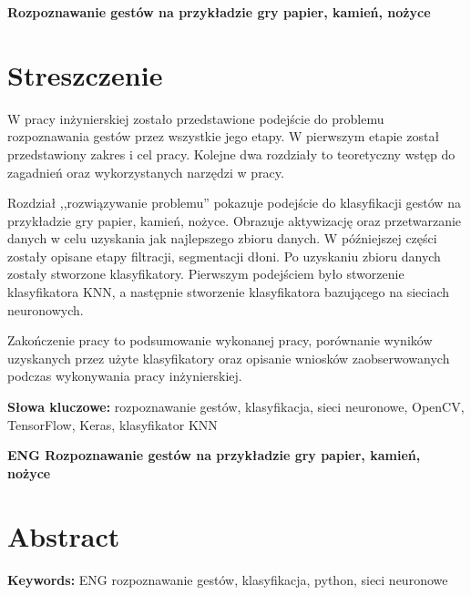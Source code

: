 \newpage
\begin{center}
\large \bf
Rozpoznawanie gestów na przykładzie gry papier, kamień, nożyce
\end{center}

\section*{Streszczenie}
W pracy inżynierskiej zostało przedstawione podejście do problemu rozpoznawania gestów przez wszystkie jego etapy. W pierwszym etapie został przedstawiony zakres i cel pracy. Kolejne dwa rozdziały to teoretyczny wstęp do zagadnień oraz wykorzystanych narzędzi w pracy. 

Rozdział ,,rozwiązywanie problemu'' pokazuje podejście do klasyfikacji gestów na przykładzie gry papier, kamień, nożyce. Obrazuje aktywizację oraz  przetwarzanie danych w celu uzyskania jak najlepszego zbioru danych. W późniejszej części zostały opisane etapy filtracji, segmentacji dłoni. Po uzyskaniu zbioru danych zostały stworzone klasyfikatory. Pierwszym podejściem było stworzenie klasyfikatora KNN, a następnie stworzenie klasyfikatora bazującego na sieciach neuronowych. 

Zakończenie pracy to podsumowanie wykonanej pracy, porównanie wyników uzyskanych przez użyte klasyfikatory oraz opisanie wniosków zaobserwowanych podczas wykonywania pracy inżynierskiej.

\bigskip
{\noindent\bf Słowa kluczowe:} rozpoznawanie gestów, klasyfikacja, sieci neuronowe, OpenCV, TensorFlow, Keras, klasyfikator KNN

\vskip 2cm


\begin{center}
\large \bf
ENG Rozpoznawanie gestów na przykładzie gry papier, kamień, nożyce
\end{center}

\section*{Abstract}

\bigskip
{\noindent\bf Keywords:} ENG rozpoznawanie gestów, klasyfikacja, python, sieci neuronowe

\vfill